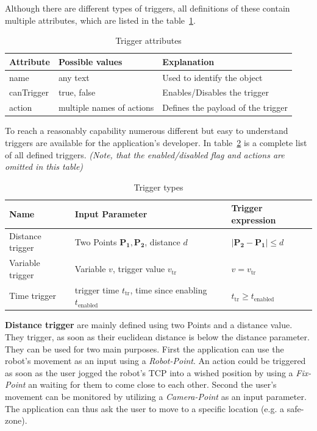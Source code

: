 Although there are different types of triggers, all definitions of these contain multiple attributes, which are listed in the table~\ref{Table:TriggerAttributes}.

 \begin{table}[!h]
 	\caption{Trigger attributes}
 	\label{Table:TriggerAttributes}
 	\centering
 	\begin{tabular}{lll}
 		\toprule
 		Attribute & Possible values		& Explanation	\\		
 		\midrule
 		name & any text & Used to identify the object \\
 		canTrigger & true, false		& Enables/Disables the trigger \\
 		action & multiple names of actions & Defines the payload of the trigger \\
 		\bottomrule
 	\end{tabular}
 \end{table}

To reach a reasonably capability numerous different but easy to understand triggers are available for the application's developer. In table~\ref{Table:Triggers} is a complete list of all defined triggers. \textit{(Note, that the enabled/disabled flag and actions are omitted in this table)}

 
 \begin{table}
 	\caption{Trigger types}
 	\label{Table:Triggers}
 	\centering
 	\begin{tabular}{lll}
 		\toprule
 		Name & Input Parameter		& Trigger expression	\\		
 		\midrule
 		Distance trigger & Two Points $\boldsymbol{P_1}, \boldsymbol{P_2}$, distance $d$		&  $|\boldsymbol{P_2}-\boldsymbol{P_1}| \le d$ \\
		Variable trigger & Variable $v$, trigger value $v_{\text{tr}}$ 		& $v = v_{\text{tr}}$	 \\
		Time trigger & trigger time $t_{\text{tr}}$, time since enabling $t_{\text{enabled}}$ & $t_{\text{tr}} \geq t_{\text{enabled}}$\\
		\bottomrule
	\end{tabular}
\end{table}

\textbf{Distance trigger} are mainly defined using two Points and a distance value. They trigger, as soon as their euclidean distance is below the distance parameter. They can be used for two main purposes. First the application can use the robot's movement as an input using a \textit{Robot-Point}. An action could be triggered as soon as the user jogged the robot's TCP into a wished position by using a \textit{Fix-Point} an waiting for them to come close to each other. Second the user's movement can be monitored by utilizing a \textit{Camera-Point} as an input parameter. The application can thus ask the user to move to a specific location (e.g. a safe-zone).

